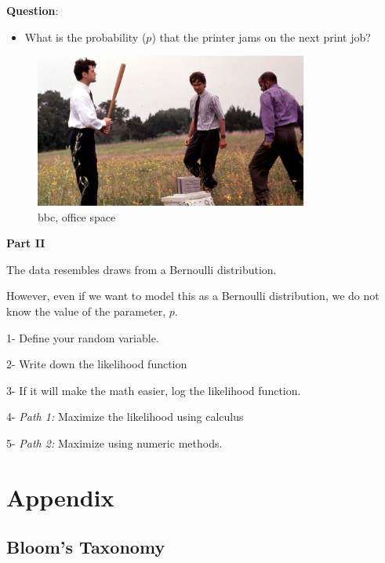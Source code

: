 \documentclass[
]{book}
\providecommand{\tightlist}{%
  \setlength{\itemsep}{0pt}\setlength{\parskip}{0pt}}
\theoremstyle{definition}
\theoremstyle{definition}
\theoremstyle{definition}
\theoremstyle{definition}
\theoremstyle{remark}
\begin{document}
\textbf{Question}:

\begin{itemize}
\tightlist
\item
  What is the probability (\(p\)) that the printer jams on the next print job?
\end{itemize}

\begin{figure}
\centering
\includegraphics[width=0.8\textwidth,height=\textheight]{./images/office_space.jpg}
\caption{bbc, office space}
\end{figure}

\textbf{Part II}

The data resembles draws from a Bernoulli distribution.

However, even if we want to model this as a Bernoulli distribution, we do not know the value of the parameter, \(p\).

1- Define your random variable.

2- Write down the likelihood function

3- If it will make the math easier, log the likelihood function.

4- \emph{Path 1:} Maximize the likelihood using calculus

5- \emph{Path 2:} Maximize using numeric methods.

\hypertarget{appendix}{%
\chapter*{Appendix}\label{appendix}}

\hypertarget{blooms-taxonomy}{%
\section*{Bloom's Taxonomy}\label{blooms-taxonomy}}
\end{document}
